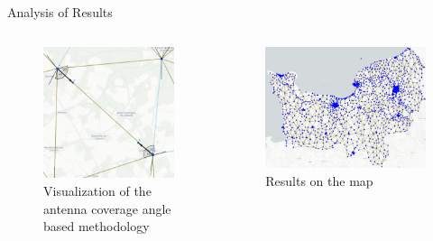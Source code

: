 \begin{frame}{Analysis of Results}
    \begin{columns}
        \begin{column}{0.5\textwidth}
            \begin{figure}
                \includegraphics[height=0.3\paperwidth]{images/Altair/azimuth_expl.png}
                \caption{Visualization of the antenna coverage angle based methodology}
            \end{figure}
        \end{column}
        \begin{column}{0.5\textwidth}
            \begin{figure}
                \includegraphics[height=0.6\paperheight]{images/Altair/azimuth_neigh_detect_normandy.png}
                \caption{Results on the map}
            \end{figure}
        \end{column}
    \end{columns}        
\end{frame}

